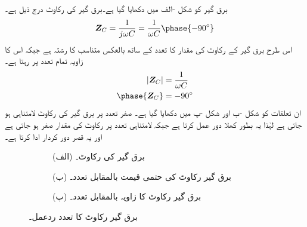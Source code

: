 برق گیر کو شکل -الف میں دکھایا گیا ہے۔برق گیر کی رکاوٹ درج ذیل ہے۔
\begin{align}
\bZ_C=\frac{1}{j\omega C}=\frac{1}{\omega C}\phase{-90^{\circ}}
\end{align}
اس طرح برق گیر کے رکاوٹ کی مقدار کا تعدد کے ساتھ بالعکس متناسب کا رشتہ ہے جبکہ اس کا زاویہ تمام تعدد پر  رہتا ہے۔
\begin{align}
\abs{\bZ_C}&=\frac{1}{\omega C}\\
\phase{\bZ_C}&=-90^{\circ}
\end{align}
ان تعلقات کو شکل -ب اور شکل -پ میں دکھایا گیا ہے۔ صفر تعدد پر برق گیر کی رکاوٹ لامتناہی ہو جاتی ہے لہٰذا یہ بطور کھلا دور عمل کرتا ہے جبکہ لامتناہی تعدد پر رکاوٹ کی مقدار صفر ہو جاتی ہے اور یہ قصر دور کردار ادا کرتا ہے۔
\begin{figure}
\centering
\begin{subfigure}{1\textwidth}
\centering
{}
\caption*{(الف) برق گیر کی رکاوٹ۔}
\end{subfigure}
\begin{subfigure}{0.5\textwidth}
\centering
{}%
\caption*{(ب) برق گیر رکاوٹ کی حتمی قیمت بالمقابل تعدد۔}
\end{subfigure}%
\begin{subfigure}{0.5\textwidth}
\centering
{}%
\caption*{(پ) برق گیر رکاوٹ کا زاویہ بالمقابل تعدد۔}
\end{subfigure}%
\caption{برق گیر رکاوٹ کا تعدد ردعمل۔}
\label{شکل_تعددی_برق_گیری_ردعمل}
\end{figure}

